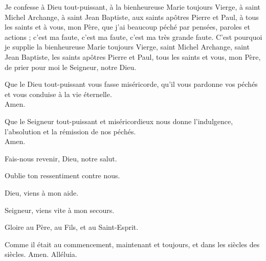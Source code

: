 \documentclass[twoside]{article}
\begin{document}
\begin{paracol}[1]{2}
\rr Je confesse à Dieu tout-puissant, à la bienheureuse Marie toujours Vierge, à saint Michel Archange, à saint Jean Baptiste, aux saints apôtres Pierre et Paul, à tous les saints et à vous, mon Père, que j’ai beaucoup péché par pensées, paroles et actions ; c’est ma faute, c’est ma faute, c’est ma très grande faute.
C’est pourquoi je supplie la bienheureuse Marie toujours Vierge, saint Michel Archange, saint Jean Baptiste, les saints apôtres Pierre et Paul, tous les saints et vous, mon Père, de prier pour moi le Seigneur, notre Dieu.

\vv Que le Dieu tout-puissant vous fasse miséricorde, qu’il vous pardonne vos péchés et vous conduise à la vie éternelle.\\
\rr Amen.

\vv Que le Seigneur tout-puissant et miséricordieux nous donne l’indulgence, l’absolution et la rémission de nos péchés.\\
\rr Amen.

\switchcolumn*


\switchcolumn

\vv Fais-nous revenir, Dieu, notre salut.

\rr Oublie ton ressentiment contre nous.

\switchcolumn*


\switchcolumn

\vv Dieu, viens à mon aide.

\rr Seigneur, viens vite à mon secours.

\vv Gloire au Père, au Fils, et au Saint-Esprit.

\rr Comme il était au commencement, maintenant et toujours, et dans les siècles des siècles. Amen. Alléluia.

\switchcolumn*



\end{paracol}
\end{document}
